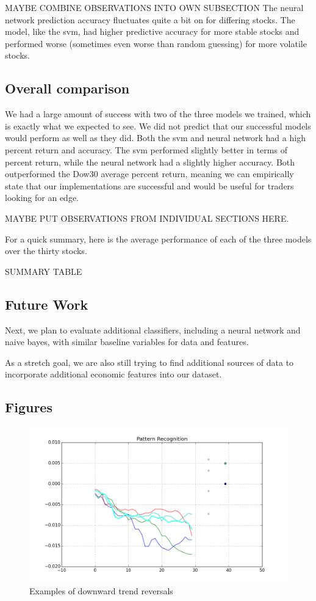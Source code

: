 \documentclass{article}
\begin{document}
MAYBE COMBINE OBSERVATIONS INTO OWN SUBSECTION
The neural network prediction accuracy fluctuates quite a bit on for differing stocks. The model, like the svm, had higher predictive accuracy for more stable stocks and performed worse (sometimes even worse than random guessing) for more volatile stocks.

\subsection{Overall comparison}
We had a large amount of success with two of the three models we trained, which is exactly what we expected to see. We did not predict that our successful models would perform as well as they did. Both the svm and neural network had a high percent return and accuracy. The svm performed slightly better in terms of percent return, while the neural network had a slightly higher accuracy. Both outperformed the Dow30 average percent return, meaning we can empirically state that our implementations are successful and would be useful for traders looking for an edge.

MAYBE PUT OBSERVATIONS FROM INDIVIDUAL SECTIONS HERE.

For a quick summary, here is the average performance of each of the three models over the thirty stocks.

SUMMARY TABLE

\subsection{Future Work}

Next, we plan to evaluate additional classifiers, including a neural network and naive bayes, with similar baseline variables for data and features.

As a stretch goal, we are also still trying to find additional sources of data to incorporate additional economic features into our dataset.

\subsection{Figures}

\begin{figure}[h!]
\begin{center}
        \includegraphics[scale=0.3]{figure_2}
        \caption{Examples of downward trend reversals}
\end{center}
\end{figure}
\end{document}
